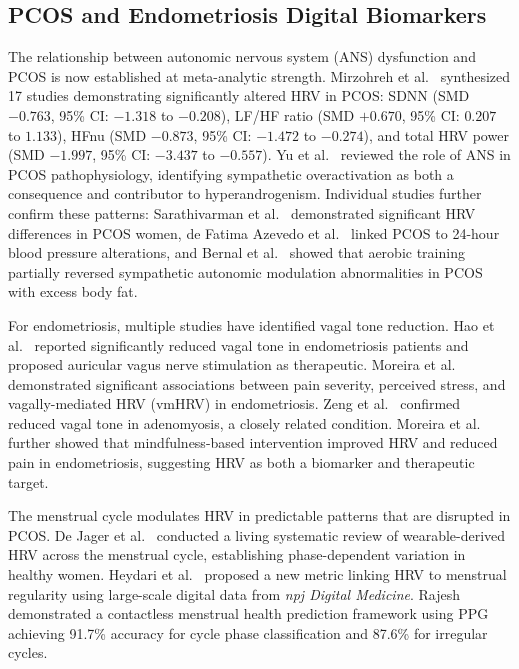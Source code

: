 \documentclass[conference]{IEEEtran}
\begin{document}
\subsection{PCOS and Endometriosis Digital Biomarkers}

The relationship between autonomic nervous system (ANS) dysfunction and PCOS is now established at meta-analytic strength. Mirzohreh et al.~\cite{Mirzohreh_2024} synthesized 17 studies demonstrating significantly altered HRV in PCOS: SDNN (SMD $-0.763$, 95\% CI: $-1.318$ to $-0.208$), LF/HF ratio (SMD $+0.670$, 95\% CI: $0.207$ to $1.133$), HFnu (SMD $-0.873$, 95\% CI: $-1.472$ to $-0.274$), and total HRV power (SMD $-1.997$, 95\% CI: $-3.437$ to $-0.557$). Yu et al.~\cite{Yu_2024} reviewed the role of ANS in PCOS pathophysiology, identifying sympathetic overactivation as both a consequence and contributor to hyperandrogenism. Individual studies further confirm these patterns: Sarathivarman et al.~\cite{Sarathivarman_2025} demonstrated significant HRV differences in PCOS women, de Fatima Azevedo et al.~\cite{de_Fatima_Azevedo_2026} linked PCOS to 24-hour blood pressure alterations, and Bernal et al.~\cite{Bernal_2024} showed that aerobic training partially reversed sympathetic autonomic modulation abnormalities in PCOS with excess body fat.

For endometriosis, multiple studies have identified vagal tone reduction. Hao et al.~\cite{Hao_2021} reported significantly reduced vagal tone in endometriosis patients and proposed auricular vagus nerve stimulation as therapeutic. Moreira et al.~\cite{Moreira_2021} demonstrated significant associations between pain severity, perceived stress, and vagally-mediated HRV (vmHRV) in endometriosis. Zeng et al.~\cite{Zeng_2025} confirmed reduced vagal tone in adenomyosis, a closely related condition. Moreira et al.~\cite{Moreira_2024} further showed that mindfulness-based intervention improved HRV and reduced pain in endometriosis, suggesting HRV as both a biomarker and therapeutic target.

The menstrual cycle modulates HRV in predictable patterns that are disrupted in PCOS. De Jager et al.~\cite{de_Jager_2026} conducted a living systematic review of wearable-derived HRV across the menstrual cycle, establishing phase-dependent variation in healthy women. Heydari et al.~\cite{Heydari_2025} proposed a new metric linking HRV to menstrual regularity using large-scale digital data from \textit{npj Digital Medicine}. Rajesh~\cite{Rajesh_2025} demonstrated a contactless menstrual health prediction framework using PPG achieving 91.7\% accuracy for cycle phase classification and 87.6\% for irregular cycles.
\end{document}
